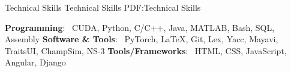 \Section
{Technical Skills}
{Technical Skills}
{PDF:Technical Skills}

\Entry
{\bf Programming}: ~CUDA, Python, C/C++, Java, MATLAB, Bash, SQL, Assembly \newline
{\bf Software \& Tools}: ~PyTorch, {\LaTeX}, Git, Lex, Yacc, Mayavi, TraitsUI, ChampSim, NS-3 \newline
{\bf Tools/Frameworks}: ~HTML, CSS, JavaScript, Angular, Django